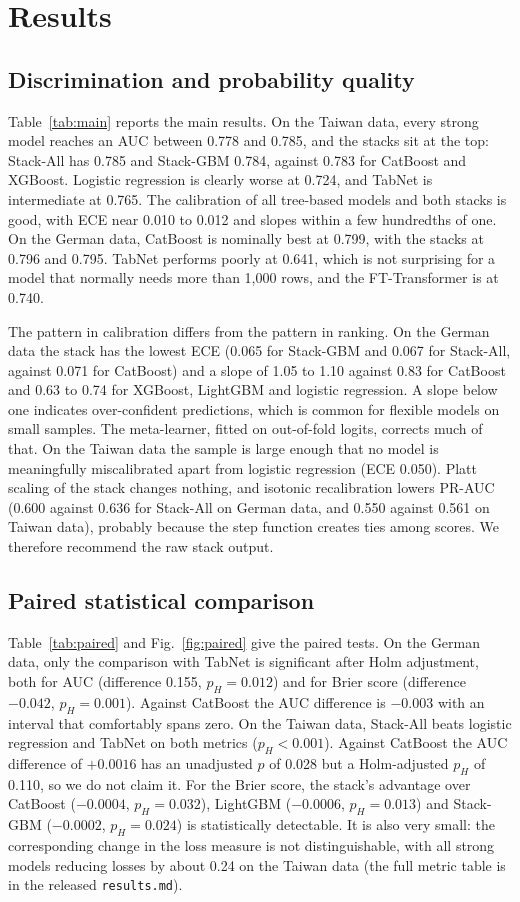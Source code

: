 \section{Results}
\subsection{Discrimination and probability quality}
Table~\ref{tab:main} reports the main results. On the Taiwan data, every strong model reaches an AUC between 0.778 and 0.785, and the stacks sit at the top: Stack-All has 0.785 and Stack-GBM 0.784, against 0.783 for CatBoost and XGBoost. Logistic regression is clearly worse at 0.724, and TabNet is intermediate at 0.765. The calibration of all tree-based models and both stacks is good, with ECE near 0.010 to 0.012 and slopes within a few hundredths of one. On the German data, CatBoost is nominally best at 0.799, with the stacks at 0.796 and 0.795. TabNet performs poorly at 0.641, which is not surprising for a model that normally needs more than 1{,}000 rows, and the FT-Transformer is at 0.740.



The pattern in calibration differs from the pattern in ranking. On the German data the stack has the lowest ECE (0.065 for Stack-GBM and 0.067 for Stack-All, against 0.071 for CatBoost) and a slope of 1.05 to 1.10 against 0.83 for CatBoost and 0.63 to 0.74 for XGBoost, LightGBM and logistic regression. A slope below one indicates over-confident predictions, which is common for flexible models on small samples. The meta-learner, fitted on out-of-fold logits, corrects much of that. On the Taiwan data the sample is large enough that no model is meaningfully miscalibrated apart from logistic regression (ECE 0.050). Platt scaling of the stack changes nothing, and isotonic recalibration lowers PR-AUC (0.600 against 0.636 for Stack-All on German data, and 0.550 against 0.561 on Taiwan data), probably because the step function creates ties among scores. We therefore recommend the raw stack output.

\subsection{Paired statistical comparison}
Table~\ref{tab:paired} and Fig.~\ref{fig:paired} give the paired tests. On the German data, only the comparison with TabNet is significant after Holm adjustment, both for AUC (difference 0.155, $p_H=0.012$) and for Brier score (difference $-0.042$, $p_H=0.001$). Against CatBoost the AUC difference is $-0.003$ with an interval that comfortably spans zero. On the Taiwan data, Stack-All beats logistic regression and TabNet on both metrics ($p_H<0.001$). Against CatBoost the AUC difference of $+0.0016$ has an unadjusted $p$ of 0.028 but a Holm-adjusted $p_H$ of 0.110, so we do not claim it. For the Brier score, the stack's advantage over CatBoost ($-0.0004$, $p_H=0.032$), LightGBM ($-0.0006$, $p_H=0.013$) and Stack-GBM ($-0.0002$, $p_H=0.024$) is statistically detectable. It is also very small: the corresponding change in the loss measure is not distinguishable, with all strong models reducing losses by about 0.24 on the Taiwan data (the full metric table is in the released \texttt{results.md}).

